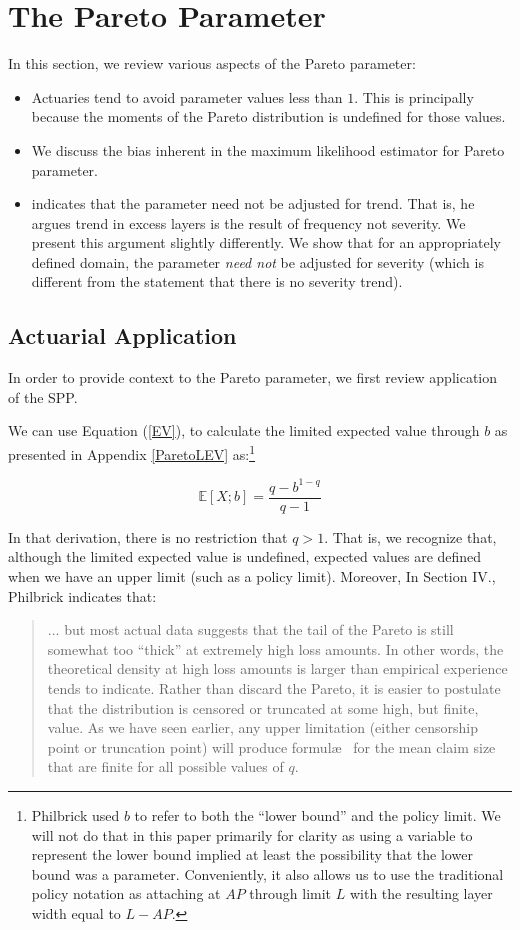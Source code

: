 \section{The Pareto Parameter}
In this section, we review various aspects of the Pareto parameter:
\begin{itemize}
	\item Actuaries tend to avoid parameter values less than $1$. This is principally because the moments of the Pareto distribution is undefined for those values.
	
	\item We discuss the bias inherent in the maximum likelihood estimator for Pareto parameter.
	 
	\item \philbrick indicates that the parameter need not be adjusted for trend. That is, he argues trend in excess layers is the result of frequency not severity. We present this argument slightly differently. We show that for an appropriately defined domain, the parameter \emph{need not} be adjusted for severity (which is different from the statement that there is no severity trend).
\end{itemize}


\subsection{Actuarial Application}
In order to provide context to the Pareto parameter, we first review application of the SPP. 

We can use Equation (\ref{EV}), to calculate the limited expected value through $b$ as presented in Appendix \ref{ParetoLEV} as:\footnote{Philbrick used $b$ to refer to both the ``lower bound'' and the policy limit. We will not do that in this paper primarily for clarity as using a variable to represent the lower bound implied at least the possibility that the lower bound was a parameter. Conveniently, it also allows us  to use the traditional policy notation as attaching at $AP$ through limit $L$ with the resulting layer width equal to $L - AP$.} 

\begin{equation}
	\mathbb{E}[X;b] = \frac{q - b^{1-q}}{q-1}\label{eqntx:ParetoLEV}
\end{equation}

In that derivation, there is no restriction that $q > 1$. That is, we recognize that, although the limited expected value is undefined, expected values are defined when we have an upper limit (such as a policy limit). Moreover, In Section IV., Philbrick indicates that:
\begin{quote}
	... but most actual data suggests that the tail of the Pareto is still somewhat too “thick” at extremely high loss amounts. In other words, the theoretical density at high loss amounts is larger than empirical experience tends to indicate. Rather than discard the Pareto, it is easier to postulate that the distribution is censored or truncated at some high, but finite, value. As we have seen earlier, any upper limitation (either censorship point or truncation point) will produce formul\ae~ for the mean claim size that are finite for all possible
	values of $q$. 
\end{quote}

